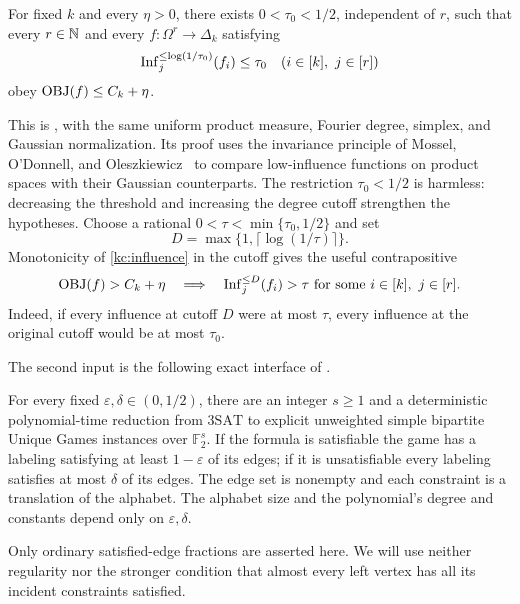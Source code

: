 \begin{theorem}\label{kc:kn-input}
For fixed \(k\) and every \(\eta>0\), there exists \(0<\tau_0<1/2\),
independent of \(r\), such that every \(r\in\mathbb N\) and every
\(f:\Omega^r\to\Delta_k\) satisfying
\[
 \operatorname{Inf}_j^{\le\log(1/\tau_0)}(f_i)\le\tau_0
 \quad(i\in[k],\ j\in[r])
\]
obey \(\operatorname{OBJ}(f)\le C_k+\eta\).
\end{theorem}

This is \cite[Theorem~3.8]{KhotNaor}, with the same uniform product
measure, Fourier degree, simplex, and Gaussian normalization. Its proof
uses the invariance principle of Mossel, O'Donnell, and
Oleszkiewicz~\cite{MOO} to compare low-influence functions on product
spaces with their Gaussian counterparts.
The restriction \(\tau_0<1/2\) is harmless: decreasing the threshold
and increasing the degree cutoff strengthen the hypotheses.
Choose a rational \(0<\tau<\min\{\tau_0,1/2\}\) and set
\begin{equation}\label{kc:cutoff}
 D=\max\{1,\lceil\log(1/\tau)\rceil\}.
\end{equation}
Monotonicity of \eqref{kc:influence} in the cutoff gives the useful
contrapositive
\begin{equation}\label{kc:contrapositive}
 \operatorname{OBJ}(f)>C_k+\eta
 \quad\Longrightarrow\quad
 \operatorname{Inf}_j^{\le D}(f_i)>\tau
 \text{ for some }i\in[k],\ j\in[r].
\end{equation}
Indeed, if every influence at cutoff \(D\) were at most \(\tau\),
every influence at the original cutoff would be at most \(\tau_0\).

The second input is the following exact interface of
\cite[Theorem~1.1]{UniqueGamesTheorem}.

\begin{theorem}\label{kc:ug-input}
For every fixed \(\varepsilon,\delta\in(0,1/2)\), there are an
integer \(s\ge1\) and a deterministic polynomial-time reduction
from \(\mathrm{3SAT}\) to explicit unweighted simple bipartite
Unique Games instances over \(\mathbb F_2^s\). If the formula is
satisfiable the game has a labeling satisfying at least
\(1-\varepsilon\) of its edges; if it is unsatisfiable every
labeling satisfies at most \(\delta\) of its edges. The edge set
is nonempty and each constraint is a translation of the alphabet.
The alphabet size and the polynomial's degree and constants depend
only on \(\varepsilon,\delta\).
\end{theorem}

Only ordinary satisfied-edge fractions are asserted here. We will
use neither regularity nor the stronger condition that almost every
left vertex has all its incident constraints satisfied.

